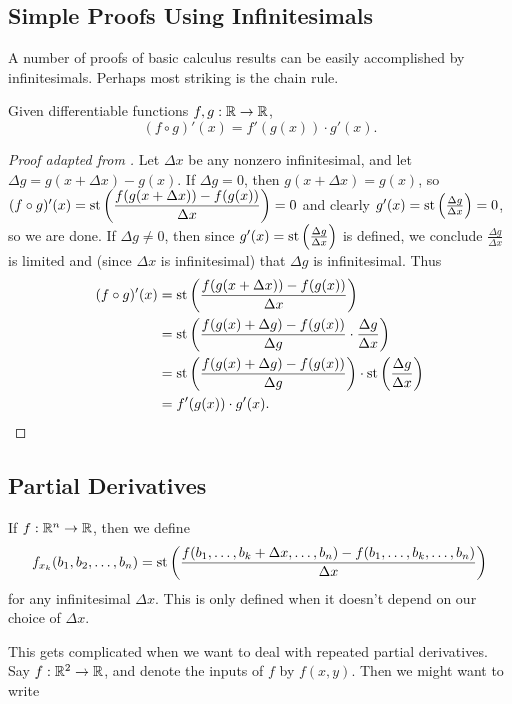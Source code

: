 \subsection{Simple Proofs Using Infinitesimals}
A number of proofs of basic calculus results can be easily accomplished by infinitesimals. Perhaps most striking is the chain rule.

\begin{thm}\label{ChainRule}
    Given differentiable functions $f, g: \mathbb{R} \to \mathbb{R}$, 
    \[(f \circ g)'(x) = f'(g(x)) \cdot g'(x).\]
\end{thm}

\begin{proof}[Proof adapted from ] 
    Let $\Delta x$ be any nonzero infinitesimal, and let $\Delta g = g(x + \Delta x) - g(x)$. If $\Delta g = 0$, then $g(x + \Delta x) = g(x)$, so $(f \circ g)'(x) = \operatorname{st}\left(\dfrac{f(g(x + \Delta x)) - f(g(x))}{\Delta x}\right) = 0$ and clearly $g'(x) = \operatorname{st}\left(\frac{\Delta g}{\Delta x}\right) = 0$, so we are done. If $\Delta g \neq 0$, then since $g'(x) = \operatorname{st}\left(\frac{\Delta g}{\Delta x}\right)$ is defined, we conclude $\frac{\Delta g}{\Delta x}$ is limited and (since $\Delta x$ is infinitesimal) that $\Delta g$ is infinitesimal. Thus
\begin{align*}
    (f \circ g)'(x) &= \operatorname{st}\left(\frac{f(g(x + \Delta x)) - f(g(x))}{\Delta x}\right) \\
        &= \operatorname{st}\left(\frac{f(g(x) + \Delta g) - f(g(x))}{\Delta g} \cdot \frac{\Delta g}{\Delta x}\right) \\
        &= \operatorname{st}\left(\frac{f(g(x) + \Delta g) - f(g(x))}{\Delta g}\right) \cdot \operatorname{st}\left(\frac{\Delta g}{\Delta x}\right) \\
        &= f'(g(x)) \cdot g'(x).
\end{align*}
\end{proof}

\subsection{Partial Derivatives}
\begin{defn}
    If $f: \mathbb{R}^n \to \mathbb{R}$, then we define
    \[f_{x_k}(b_1, b_2, \ldots, b_n) = \operatorname{st}\left(\frac{f(b_1, \ldots, b_k + \Delta x, \ldots, b_n) - f(b_1, \ldots, b_k, \ldots, b_n)}{\Delta x}\right) \]
    for any infinitesimal $\Delta x$. This is only defined when it doesn't depend on our choice of $\Delta x$.
\end{defn}

This gets complicated when we want to deal with repeated partial derivatives. Say $f: \mathbb{R}^2 \to \mathbb{R}$, and denote the inputs of $f$ by $f(x, y)$. Then we might want to write

